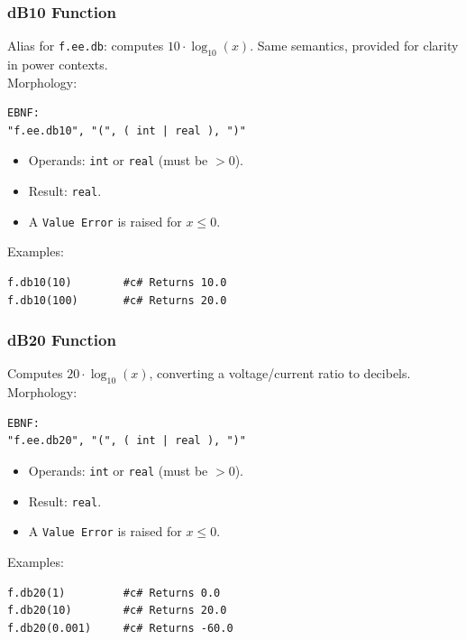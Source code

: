\subsubsection{dB10 Function}
Alias for \texttt{f.ee.db}: computes $10 \cdot \log_{10}(x)$. Same semantics, provided for clarity in power contexts. \\
Morphology:
\begin{verbatim}
EBNF:
"f.ee.db10", "(", ( int | real ), ")"
\end{verbatim}
\begin{itemize}
\item Operands: \texttt{int} or \texttt{real} (must be $> 0$).
\item Result: \texttt{real}.
\item A \texttt{Value Error} is raised for $x \leq 0$.
\end{itemize}
Examples:
\begin{verbatim}
f.db10(10)        #c# Returns 10.0
f.db10(100)       #c# Returns 20.0
\end{verbatim}

\subsubsection{dB20 Function}
Computes $20 \cdot \log_{10}(x)$, converting a voltage/current ratio to decibels. \\
Morphology:
\begin{verbatim}
EBNF:
"f.ee.db20", "(", ( int | real ), ")"
\end{verbatim}
\begin{itemize}
\item Operands: \texttt{int} or \texttt{real} (must be $> 0$).
\item Result: \texttt{real}.
\item A \texttt{Value Error} is raised for $x \leq 0$.
\end{itemize}
Examples:
\begin{verbatim}
f.db20(1)         #c# Returns 0.0
f.db20(10)        #c# Returns 20.0
f.db20(0.001)     #c# Returns -60.0
\end{verbatim}

